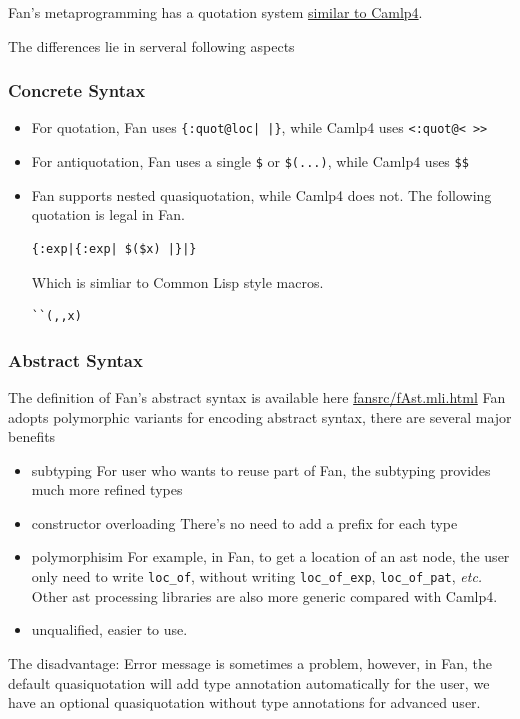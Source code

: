 \documentclass[11pt]{article}
\begin{document}
Fan's metaprogramming has a quotation system \href{http://brion.inria.fr/gallium/index.php/Quotation}{similar to Camlp4}.

The differences lie in serveral following aspects


\subsubsection{Concrete Syntax}
\label{sec-5-1-1}

\begin{itemize}
\item For quotation, Fan uses \verb~{:quot@loc| |}~, while Camlp4 uses \verb~<:quot@< >>~
\item For antiquotation, Fan uses a single \verb~$~ or \verb~$(...)~, while Camlp4 uses \verb~$$~
\item Fan supports nested quasiquotation, while Camlp4 does not.
The following quotation is legal  in Fan.
\begin{verbatim}
{:exp|{:exp| $($x) |}|}
\end{verbatim}
Which is simliar to Common Lisp style macros.
\begin{verbatim}
``(,,x)
\end{verbatim}
\end{itemize}
\subsubsection{Abstract Syntax}
\label{sec-5-1-2}
The definition of Fan's abstract syntax is available here
\url{fansrc/fAst.mli.html}
Fan adopts polymorphic variants for encoding abstract syntax,
there are several major benefits

\begin{itemize}
\item subtyping
For user who wants to reuse part of Fan, the subtyping provides
much more refined types
\item constructor overloading
There's no need to add a prefix for each type
\item polymorphisim
For example, in Fan, to get a location of an ast node, the user
only need to write \verb~loc_of~, without writing \verb~loc_of_exp~,
\verb~loc_of_pat~, \emph{etc.} Other ast processing libraries are also
more generic compared with Camlp4.
\item unqualified, easier to use.
\end{itemize}

The disadvantage:
Error message is sometimes a problem, however, in Fan, the
default quasiquotation will add type annotation automatically for
the user, we have an optional quasiquotation without type
annotations for advanced user.
\end{document}
